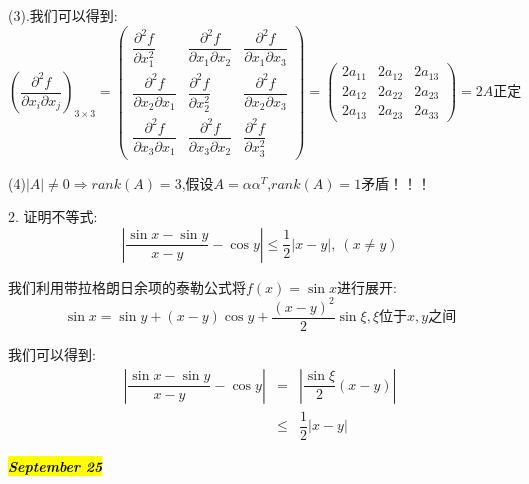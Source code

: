 \begin{solution}
(3).我们可以得到:  
$$\left( \dfrac{\partial^2 f}{\partial x_{i}\partial x_{j}}\right)_{3\times 3}=\left( \begin{matrix}
	\dfrac{\partial^2 f}{\partial x_{1}^2}&\dfrac{\partial^2 f}{\partial x_{1}\partial x_{2}}&\dfrac{\partial^2 f}{\partial x_{1}\partial x_{3}}\\
	\dfrac{\partial^2 f}{\partial x_{2}\partial x_{1}}&\dfrac{\partial^2 f}{\partial x_{2}^2}&\dfrac{\partial^2 f}{\partial x_{2}\partial x_{3}}\\
	\dfrac{\partial^2 f}{\partial x_{3}\partial x_{1}}&\dfrac{\partial^2 f}{\partial x_{3}\partial x_{2}}&\dfrac{\partial^2 f}{\partial x_{3}^2}
\end{matrix}\right)=\left( \begin{matrix}
2a_{11}&2a_{12}&2a_{13}\\
2a_{12}&2a_{22}&2a_{23}\\
2a_{13}&2a_{23}&2a_{33}
\end{matrix}\right)=2A\text{正定}$$

(4)$|A|\neq 0\Rightarrow rank(A)=3$,假设$A=\alpha\alpha^{T}$,$rank(A)=1$矛盾！！！
\end{solution}


2. 证明不等式:  $$|\dfrac{\sin x-\sin y}{x-y}-\cos y|\leq \dfrac{1}{2}|x-y|,\ (x\neq y)$$
\begin{solution}

	我们利用带拉格朗日余项的泰勒公式将$f(x)=\sin x$进行展开:  
	$$\sin x=\sin y+(x-y)\cos y+\dfrac{(x-y)^2}{2}\sin\xi, \xi\text{位于}x,y\text{之间}$$
	
	我们可以得到:  
	\begin{eqnarray*}
		|\dfrac{\sin x-\sin y}{x-y}-\cos y|&=&|\dfrac{\sin\xi}{2}(x-y)|\\
		&\leq&\dfrac{1}{2}|x-y|
	\end{eqnarray*}
\end{solution}

\hl{\textbf{\textit{September 25}}}

